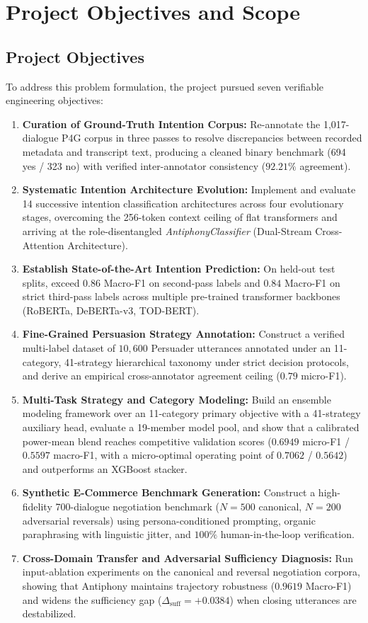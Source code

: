\section{Project Objectives and Scope}
\label{sec:objectives}

\subsection{Project Objectives}
To address this problem formulation, the project pursued seven verifiable engineering objectives:
\begin{enumerate}[label=\textbf{O\arabic*.}]
  \item \textbf{Curation of Ground-Truth Intention Corpus:} Re-annotate the 1,017-dialogue P4G corpus in three passes to resolve discrepancies between recorded metadata and transcript text, producing a cleaned binary benchmark (694 yes / 323 no) with verified inter-annotator consistency ($92.21\%$ agreement).
  \item \textbf{Systematic Intention Architecture Evolution:} Implement and evaluate 14 successive intention classification architectures across four evolutionary stages, overcoming the 256-token context ceiling of flat transformers and arriving at the role-disentangled \textit{AntiphonyClassifier} (Dual-Stream Cross-Attention Architecture).
  \item \textbf{Establish State-of-the-Art Intention Prediction:} On held-out test splits, exceed $0.86$ Macro-F1 on second-pass labels and $0.84$ Macro-F1 on strict third-pass labels across multiple pre-trained transformer backbones (RoBERTa, DeBERTa-v3, TOD-BERT).
  \item \textbf{Fine-Grained Persuasion Strategy Annotation:} Construct a verified multi-label dataset of $10{,}600$ Persuader utterances annotated under an 11-category, 41-strategy hierarchical taxonomy under strict decision protocols, and derive an empirical cross-annotator agreement ceiling ($0.79$ micro-F1).
  \item \textbf{Multi-Task Strategy and Category Modeling:} Build an ensemble modeling framework over an 11-category primary objective with a 41-strategy auxiliary head, evaluate a 19-member model pool, and show that a calibrated power-mean blend reaches competitive validation scores ($0.6949$ micro-F1 / $0.5597$ macro-F1, with a micro-optimal operating point of $0.7062$ / $0.5642$) and outperforms an XGBoost stacker.
  \item \textbf{Synthetic E-Commerce Benchmark Generation:} Construct a high-fidelity 700-dialogue negotiation benchmark ($N=500$ canonical, $N=200$ adversarial reversals) using persona-conditioned prompting, organic paraphrasing with linguistic jitter, and $100\%$ human-in-the-loop verification.
  \item \textbf{Cross-Domain Transfer and Adversarial Sufficiency Diagnosis:} Run input-ablation experiments on the canonical and reversal negotiation corpora, showing that Antiphony maintains trajectory robustness ($0.9619$ Macro-F1) and widens the sufficiency gap ($\Delta_{\text{suff}} = +0.0384$) when closing utterances are destabilized.
\end{enumerate}

